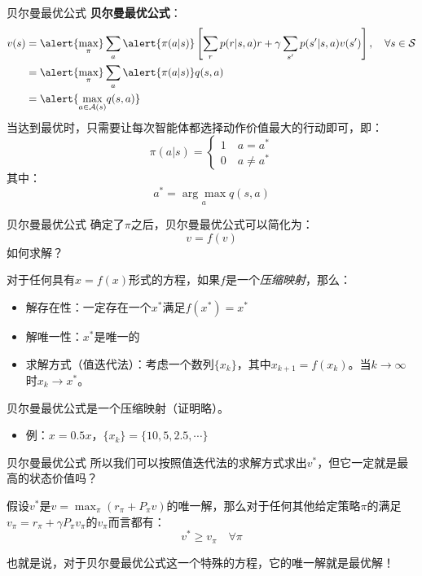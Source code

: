 \begin{frame}{贝尔曼最优公式}
    \textbf{贝尔曼最优公式}：
    \[
        \begin{aligned}
            v(s)&=\alert{\underset{\pi}{\max}}\sum_a\alert{\pi(a|s)}\left[\sum_r p(r|s,a)r+\gamma\sum_{s'}p(s'|s,a)v(s')\right], \quad \forall s\in\mathcal{S} \\
            &=\alert{\underset{\pi}{\max}}\sum_a\alert{\pi(a|s)}q(s,a) \\
            &=\alert{\underset{a\in\mathcal{A}(s)}{\max}q(s,a)}
        \end{aligned}
    \]
    当达到最优时，只需要让每次智能体都选择动作价值最大的行动即可，即：
    \[
        \pi(a|s)=
        \begin{cases}
            1 \quad a=a^* \\
            0 \quad a\neq a^*
        \end{cases}
    \]
    其中：
    \[
        a^*=\underset{a}{\arg\max} q(s,a)
    \]
\end{frame}

\begin{frame}{贝尔曼最优公式}
    确定了$\pi$之后，贝尔曼最优公式可以简化为：
    \[
        v=f(v)
    \]
    如何求解？
    \begin{theorem}[压缩映射定理]
        对于任何具有$x=f(x)$形式的方程，如果$f$是一个\textit{压缩映射}，那么：
        \begin{itemize}
            \item 解存在性：一定存在一个$x^*$满足$f(x^*)=x^*$
            \item 解唯一性：$x^*$是唯一的
            \item 求解方式（值迭代法）：考虑一个数列$\{x_k\}$，其中$x_{k+1}=f(x_k)$。当$k\rightarrow\infty$时$x_k\rightarrow x^*$。
        \end{itemize}
    \end{theorem}
    贝尔曼最优公式是一个压缩映射（证明略）。
    \begin{itemize}
        \item 例：$x=0.5x$，$\{x_k\}=\{10, 5, 2.5,\cdots\}$
    \end{itemize}
\end{frame}

\begin{frame}{贝尔曼最优公式}
    所以我们可以按照值迭代法的求解方式求出$v^*$，但它一定就是最高的状态价值吗？
    \begin{theorem}[贝尔曼最优定理]
        假设$v^*$是$v=\max_\pi(r_\pi+P_\pi v)$的唯一解，那么对于任何其他给定策略$\pi$的满足$v_\pi=r_\pi+\gamma P_\pi v_\pi$的$v_\pi$而言都有：
        \[
            v^*\geq v_\pi \quad \forall \pi
        \]
    \end{theorem}
    也就是说，对于贝尔曼最优公式这一个特殊的方程，\alert{它的唯一解就是最优解！}
\end{frame}

